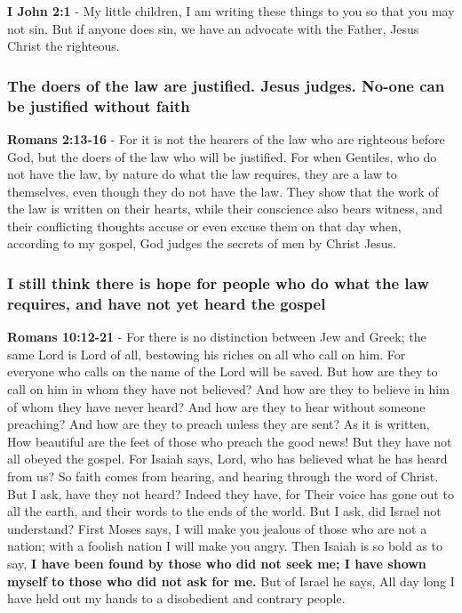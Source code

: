 \documentclass[11pt]{article}
\begin{document}
\textbf{I John 2:1} - My little children, I am writing these things to you so that you may not sin. But if anyone does sin, we have an advocate with the Father, Jesus Christ the righteous.

\subsubsection{The doers of the law are justified. Jesus judges. No-one can be justified without faith}
\label{sec:org389a269}
\textbf{Romans 2:13-16} - For it is not the hearers of the law who are righteous before God, but the doers of the law who will be justified.  For when Gentiles, who do not have the law, by nature do what the law requires, they are a law to themselves, even though they do not have the law.  They show that the work of the law is written on their hearts, while their conscience also bears witness, and their conflicting thoughts accuse or even excuse them on that day when, according to my gospel, God judges the secrets of men by Christ Jesus.

\subsubsection{I still think there is hope for people who do what the law requires, and have not yet heard the gospel}
\label{sec:org90883df}

\textbf{Romans 10:12-21} - For there is no distinction between Jew and Greek; the same Lord is Lord of all, bestowing his riches on all who call on him.  For everyone who calls on the name of the Lord will be saved.  But how are they to call on him in whom they have not believed? And how are they to believe in him of whom they have never heard? And how are they to hear without someone preaching?  And how are they to preach unless they are sent? As it is written, How beautiful are the feet of those who preach the good news!  But they have not all obeyed the gospel. For Isaiah says, Lord, who has believed what he has heard from us?  So faith comes from hearing, and hearing through the word of Christ.  But I ask, have they not heard? Indeed they have, for Their voice has gone out to all the earth, and their words to the ends of the world.  But I ask, did Israel not understand? First Moses says, I will make you jealous of those who are not a nation; with a foolish nation I will make you angry.  Then Isaiah is so bold as to say, \textbf{I have been found by those who did not seek me; I have shown myself to those who did not ask for me.} But of Israel he says, All day long I have held out my hands to a disobedient and contrary people.
\end{document}
